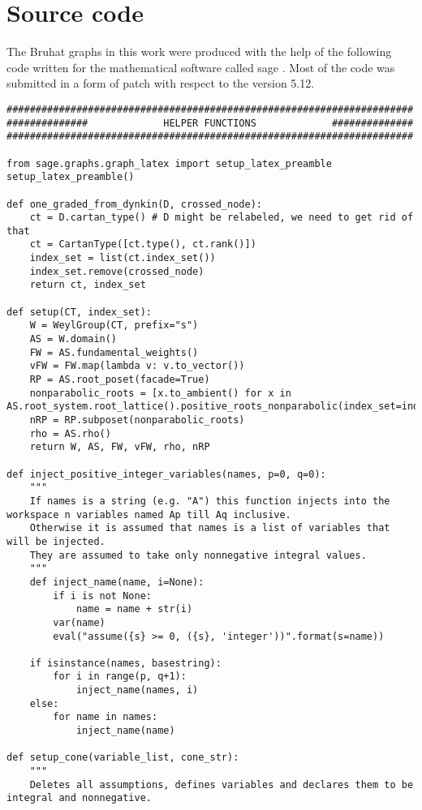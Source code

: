 \chapter{Source code}
The Bruhat graphs in this work were produced with the help of the following code written for the mathematical software called sage \cite{sage}. Most of the code was submitted in a form of patch with respect to the version 5.12.

\begin{verbatim}
######################################################################
##############             HELPER FUNCTIONS             ##############
######################################################################

from sage.graphs.graph_latex import setup_latex_preamble
setup_latex_preamble()

def one_graded_from_dynkin(D, crossed_node):
    ct = D.cartan_type() # D might be relabeled, we need to get rid of that
    ct = CartanType([ct.type(), ct.rank()])
    index_set = list(ct.index_set())
    index_set.remove(crossed_node)
    return ct, index_set

def setup(CT, index_set):
    W = WeylGroup(CT, prefix="s")
    AS = W.domain()
    FW = AS.fundamental_weights()
    vFW = FW.map(lambda v: v.to_vector())
    RP = AS.root_poset(facade=True)
    nonparabolic_roots = [x.to_ambient() for x in AS.root_system.root_lattice().positive_roots_nonparabolic(index_set=index_set)]
    nRP = RP.subposet(nonparabolic_roots)
    rho = AS.rho()
    return W, AS, FW, vFW, rho, nRP

def inject_positive_integer_variables(names, p=0, q=0):
    """
    If names is a string (e.g. "A") this function injects into the workspace n variables named Ap till Aq inclusive.
    Otherwise it is assumed that names is a list of variables that will be injected.
    They are assumed to take only nonnegative integral values.
    """
    def inject_name(name, i=None):
        if i is not None:
            name = name + str(i)
        var(name)
        eval("assume({s} >= 0, ({s}, 'integer'))".format(s=name))

    if isinstance(names, basestring):
        for i in range(p, q+1):
            inject_name(names, i)
    else:
        for name in names:
            inject_name(name)

def setup_cone(variable_list, cone_str):
    """
    Deletes all assumptions, defines variables and declares them to be integral and nonnegative.


\end{verbatim}
